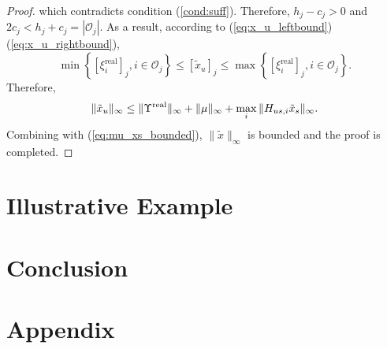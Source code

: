 \documentclass[journal]{IEEEtran}
\newcommand{\Ic}{{\mathcal{I}}}
\newcommand{\Oc}{{\mathcal{O}}}
\newcommand{\re}{\text{real}}
\newtheorem*{proof}{\textbf{Proof}}
\begin{document}
\begin{proof}
		which contradicts condition (\ref{cond:suff}).
		Therefore, $h_j-c_j>0$ and $2c_j<h_j+c_j=|\Oc_j|$.
		As a result, according to (\ref{eq:x_u_leftbound})(\ref{eq:x_u_rightbound}),
		$$\min \left\{ [\xi^\re_i]_j, i\in\Oc_j \right\}\leq [\tilde{x}_u]_j\leq \max \left\{ [\xi^\re_i]_j, i\in\Oc_j \right\}.$$
		Therefore, 
		$$\|\tilde{x}_u\|_\infty \leq\|\Upsilon^{\rm real} \|_\infty + \|\mu\|_\infty+ \max_i  \|H_{us,i}\tilde{x}_s\|_\infty .$$
		Combining with (\ref{eq:mu_xs_bounded}), $\|\tilde{x}\|_\infty$ is bounded and the proof is completed.
	\end{proof}
	
	
	\section{Illustrative Example}
	
	
	
	\section{Conclusion}\label{sec:conclusion}
	
	
	
	\section{Appendix}
\end{document}
